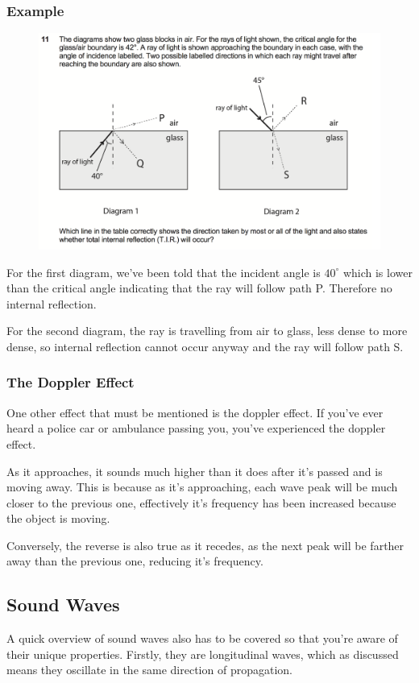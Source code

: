 \documentclass[11pt, titlepage]{article}
\begin{document}
\subsubsection*{Example}

\begin{figure}[H]
\centering
\includegraphics[width=\textwidth]{2013q11}
\end{figure}

For the first diagram, we've been told that the incident angle is $40^\circ$ which is lower than the critical angle indicating that the ray will follow path P.  Therefore no internal reflection.

For the second diagram, the ray is travelling from air to glass, less dense to more dense, so internal reflection cannot occur anyway and the ray will follow path S.

\subsubsection*{The Doppler Effect}
One other effect that must be mentioned is the doppler effect.  If you've ever heard a police car or ambulance passing you, you've experienced the doppler effect.  

As it approaches, it sounds much higher than it does after it's passed and is moving away.  This is because as it's approaching, each wave peak will be much closer to the previous one, effectively it's frequency has been increased because the object is moving. 

Conversely, the reverse is also true as it recedes, as the next peak will be farther away than the previous one, reducing it's frequency.  


\subsection{Sound Waves}
A quick overview of sound waves also has to be covered so that you're aware of their unique properties.  Firstly, they are longitudinal waves, which as discussed means they oscillate in the same direction of propagation.
\end{document}
